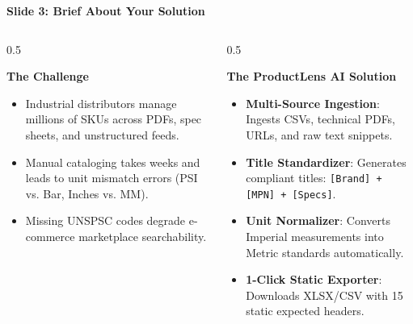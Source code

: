 \documentclass[aspectratio=169, 10pt]{beamer}
\begin{document}
\begin{frame}{\textbf{Slide 3: Brief About Your Solution}}
  \begin{columns}
    \begin{column}{0.5\textwidth}
      \begin{block}{\textbf{The Challenge}}
        \begin{itemize}
          \item Industrial distributors manage millions of SKUs across PDFs, spec sheets, and unstructured feeds.
          \item Manual cataloging takes weeks and leads to unit mismatch errors (PSI vs. Bar, Inches vs. MM).
          \item Missing UNSPSC codes degrade e-commerce marketplace searchability.
        \end{itemize}
      \end{block}
    \end{column}

    \begin{column}{0.5\textwidth}
      \begin{block}{\textbf{The ProductLens AI Solution}}
        \begin{itemize}
          \item \textbf{Multi-Source Ingestion}: Ingests CSVs, technical PDFs, URLs, and raw text snippets.
          \item \textbf{Title Standardizer}: Generates compliant titles: \texttt{[Brand] + [MPN] + [Specs]}.
          \item \textbf{Unit Normalizer}: Converts Imperial measurements into Metric standards automatically.
          \item \textbf{1-Click Static Exporter}: Downloads XLSX/CSV with 15 static expected headers.
        \end{itemize}
      \end{block}
    \end{column}
  \end{columns}
\end{frame}
\end{document}
